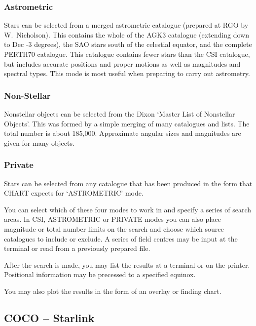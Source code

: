 \documentclass[twoside,11pt]{article}
\newcommand{\htmladdnormallink}[2]{#1}
\newcommand{\xref}[3]{#1}
\newcommand{\xlabel}[1]{}
\newcommand{\COCOref}{\xref{COCO}{sun56}{}}
\newcommand{\RGOref}{\htmladdnormallink{RGO}{http://www.ast.cam.ac.uk/RGO/RGO.html}}
\newcommand{\STARLINKref}{\htmladdnormallink{Starlink}{http://www.starlink.ac.uk/}}
\newcommand{\CHARTref}{\xref{CHART}{sun32}{}}
\begin{document}
\subsubsection{Astrometric}

Stars can be selected from a merged astrometric catalogue (prepared at {\RGOref} by
W.~Nicholson). This contains the whole of the AGK3 catalogue (extending down
to Dec -3 degrees), the SAO stars south of the celestial equator, and the complete
PERTH70 catalogue. This catalogue contains fewer stars than the CSI
catalogue, but includes accurate positions and proper motions as well as
magnitudes and spectral types. This mode is most useful when preparing to
carry out astrometry.

\subsubsection{Non-Stellar}

Nonstellar objects can be selected from the Dixon `Master List of Nonstellar
Objects'. This was formed by a simple merging of many catalogues and lists.
The total number is about 185,000. Approximate angular sizes and magnitudes
are given for many objects.

\subsubsection{Private}

Stars can be selected from any catalogue that has been produced in the form
that {\CHARTref} expects for `ASTROMETRIC' mode.

You can select which of these four modes to work in and specify a series of
search areas. In CSI, ASTROMETRIC or PRIVATE modes you can also place
magnitude or total number limits on the search and choose which source
catalogues to include or exclude. A series of field centres may be input at
the terminal or read from a previously prepared file.

After the search is made, you may list the results at a terminal or on the
printer. Positional information may be precessed to a specified equinox.

You may also plot the results in the form of an overlay or finding chart.


\subsection{{\COCOref} -- {\STARLINKref}} \xlabel{COCO}
\label{sec:coco}
\end{document}
